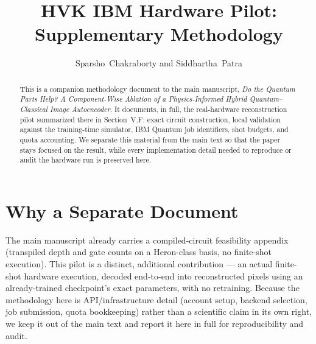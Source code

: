 \documentclass[11pt]{article}
\title{HVK IBM Hardware Pilot: Supplementary Methodology}
\author{Sparsho~Chakraborty and Siddhartha~Patra}
\date{}
\begin{document}
\maketitle

\begin{abstract}
This is a companion methodology document to the main manuscript, \textit{Do the Quantum Parts Help? A Component-Wise Ablation of a Physics-Informed Hybrid Quantum--Classical Image Autoencoder}. It documents, in full, the real-hardware reconstruction pilot summarized there in Section~V.F: exact circuit construction, local validation against the training-time simulator, IBM Quantum job identifiers, shot budgets, and quota accounting. We separate this material from the main text so that the paper stays focused on the result, while every implementation detail needed to reproduce or audit the hardware run is preserved here.
\end{abstract}

\section{Why a Separate Document}
The main manuscript already carries a compiled-circuit feasibility appendix (transpiled depth and gate counts on a Heron-class basis, no finite-shot execution). This pilot is a distinct, additional contribution --- an actual finite-shot hardware execution, decoded end-to-end into reconstructed pixels using an already-trained checkpoint's exact parameters, with no retraining. Because the methodology here is API/infrastructure detail (account setup, backend selection, job submission, quota bookkeeping) rather than a scientific claim in its own right, we keep it out of the main text and report it here in full for reproducibility and audit.
\end{document}
